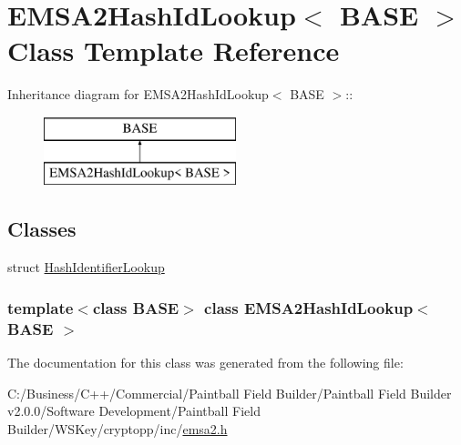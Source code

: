 \hypertarget{class_e_m_s_a2_hash_id_lookup}{
\section{EMSA2HashIdLookup$<$ BASE $>$ Class Template Reference}
\label{class_e_m_s_a2_hash_id_lookup}
}
Inheritance diagram for EMSA2HashIdLookup$<$ BASE $>$::\begin{figure}[H]
\begin{center}
\leavevmode
\includegraphics[height=2cm]{class_e_m_s_a2_hash_id_lookup}
\end{center}
\end{figure}
\subsection*{Classes}
\begin{DoxyCompactItemize}
\item 
struct \hyperlink{struct_e_m_s_a2_hash_id_lookup_1_1_hash_identifier_lookup}{HashIdentifierLookup}
\end{DoxyCompactItemize}
\subsubsection*{template$<$class BASE$>$ class EMSA2HashIdLookup$<$ BASE $>$}



The documentation for this class was generated from the following file:\begin{DoxyCompactItemize}
\item 
C:/Business/C++/Commercial/Paintball Field Builder/Paintball Field Builder v2.0.0/Software Development/Paintball Field Builder/WSKey/cryptopp/inc/\hyperlink{emsa2_8h}{emsa2.h}\end{DoxyCompactItemize}
